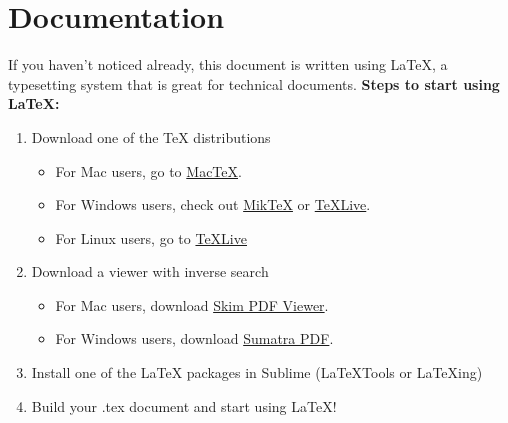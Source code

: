 \documentclass{article}
\begin{document}
\section{Documentation}
If you haven't noticed already, this document is written using \LaTeX, a typesetting system that is great for technical documents.
  \textbf{Steps to start using \LaTeX:}
  \begin{enumerate}
    \item Download one of the TeX distributions
    \begin{itemize}
      \item For Mac users, go to \href {http://www.tug.org/mactex/}{MacTeX}.
      \item For Windows users, check out \href{https://miktex.org/}{MikTeX} or \href{https://www.tug.org/texlive/}{TeXLive}.
      \item For Linux users, go to \href{https://www.tug.org/texlive/}{TeXLive}
    \end{itemize}
    \item Download a viewer with inverse search
    \begin{itemize}
      \item For Mac users, download \href {http://skim-app.sourceforge.net/}{Skim PDF Viewer}.
      \item For Windows users, download \href {https://www.sumatrapdfreader.org/free-pdf-reader.html}{Sumatra PDF}.
    \end{itemize}
    \item Install one of the LaTeX packages in Sublime (LaTeXTools or LaTeXing)
    \item Build your .tex document and start using \LaTeX!
  \end{enumerate}

\end{document}
